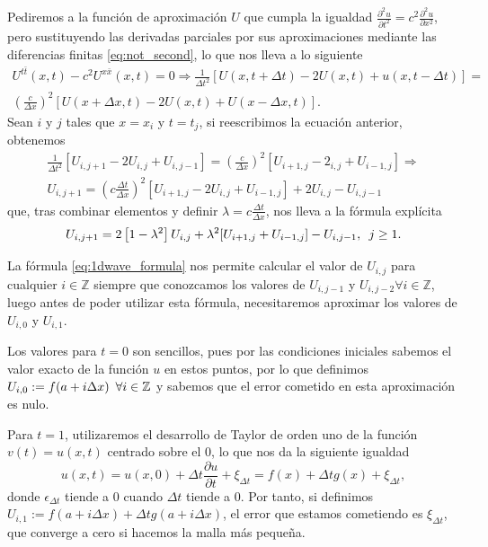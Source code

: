 Pediremos a la función de aproximación $U$ que cumpla la igualdad $\frac{\partial^2u}{\partial t^2} = c^2\frac{\partial^2u}{\partial x^2}$, pero sustituyendo las derivadas parciales por sus aproximaciones mediante las diferencias finitas \eqref{eq:not_second}, lo que nos lleva a lo siguiente
\begin{multline}
	U^{t\bar t}(x,t) - c^2U^{x\bar{x}}(x,t) = 0 \Rightarrow \frac{1}{\Delta t^2}[U(x,t + \Delta t)-2U(x,t)+u(x, t - \Delta t)]  = \\ \left(\frac{c}{\Delta x}\right)^2[U(x+\Delta x,t)-2U(x,t)+U(x-\Delta x, t)].
\end{multline}
Sean $i$ y $j$ tales que $x=x_i$ y $t=t_j$, si reescribimos la ecuación anterior, obtenemos
\begin{equation}
	\begin{split}
	\frac{1}{\Delta t^2}[U_{i,j+1}-2U_{i,j}+U_{i,j-1}] = \left(\frac{c}{\Delta x}\right)^2[U_{i+1,j}-2_{i,j}+U_{i-1,j}] \Rightarrow \\
	U_{i,j+1} = \left(c\frac{\Delta t}{\Delta x}\right)^2[U_{i+1,j}-2U_{i,j}+U_{i-1,j}] + 2U_{i,j} - U_{i,j-1}	
	\end{split}
\end{equation}
que, tras combinar elementos y definir $\lambda=c\frac{\Delta t}{\Delta x}$, nos lleva a la fórmula explícita
\begin{equation}
	\label{eq:1dwave_formula}
	U_{i,j+1} =  2\left[1 - \lambda^2\right]U_{i,j} + \lambda^2[U_{i+1,j} + U_{i-1,j}] - U_{i,j-1}, \hspace{5px} j\geq1.
\end{equation}

La fórmula \eqref{eq:1dwave_formula} nos permite calcular el valor de $U_{i,j}$ para cualquier $i\in\mathbb{Z}$ siempre que conozcamos los valores de $U_{i,j-1}$ y $U_{i,j-2} \forall i\in\mathbb{Z}$, luego antes de poder utilizar esta fórmula, necesitaremos aproximar los valores de $U_{i,0}$ y $U_{i,1}$.

Los valores para $t=0$ son sencillos, pues por las condiciones iniciales sabemos el valor exacto de la función $u$ en estos puntos, por lo que definimos $U_{i,0}:=f(a+i\Delta x)\hspace{5px} \forall i\in\mathbb{Z}$ y sabemos que el error cometido en esta aproximación es nulo.

Para $t=1$, utilizaremos el desarrollo de Taylor de orden uno de la función $v(t) = u(x,t)$ centrado sobre el 0, lo que nos da la siguiente igualdad
\begin{equation}
	u(x,t) = u(x,0) + \Delta t\frac{\partial u}{\partial t} + \xi_{\Delta t} = f(x) + \Delta tg(x) + \xi_{\Delta t},
\end{equation}
donde $\epsilon_{\Delta t}$ tiende a 0 cuando $\Delta t$ tiende a 0. Por tanto, si definimos $U_{i,1}:=f(a+i\Delta x)+\Delta tg(a+i\Delta x)$, el error que estamos cometiendo es $\xi_{\Delta t}$, que converge a cero si hacemos la malla más pequeña.

